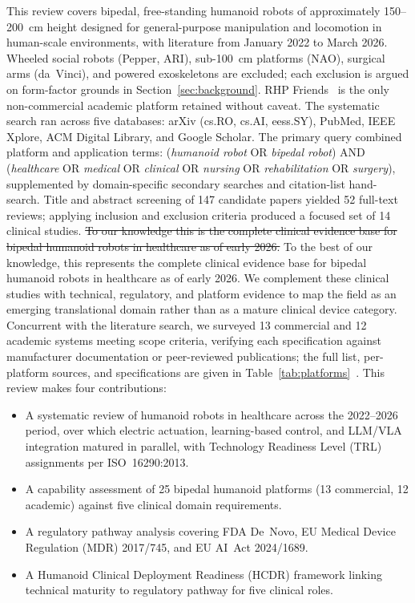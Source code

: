 This review covers bipedal, free-standing humanoid robots of approximately
150--200~cm height designed for general-purpose manipulation and locomotion in
human-scale environments, with literature from January 2022 to March 2026.
Wheeled social robots (Pepper, ARI), sub-100~cm platforms (NAO), surgical arms
(da~Vinci), and powered exoskeletons are excluded; each exclusion is argued on
form-factor grounds in Section~\ref{sec:background}. RHP
Friends~\cite{benallegue2025rhp} is the only non-commercial academic platform
retained without caveat. The systematic search ran across five databases: arXiv
(cs.RO, cs.AI, eess.SY), PubMed, IEEE Xplore, ACM Digital Library, and Google
Scholar. The primary query combined platform and application terms:
(\emph{humanoid robot} OR \emph{bipedal robot}) AND (\emph{healthcare} OR
\emph{medical} OR \emph{clinical} OR \emph{nursing} OR \emph{rehabilitation} OR
\emph{surgery}), supplemented by domain-specific secondary searches and
citation-list hand-search. Title and abstract screening of 147 candidate papers
yielded 52 full-text reviews; applying inclusion and exclusion criteria produced
a focused set of 14 clinical studies. \sout{ To our knowledge this is the complete
clinical evidence base for bipedal humanoid robots in healthcare as of early
2026.} To the best of our knowledge, this represents the complete clinical evidence base for bipedal humanoid robots in healthcare as of early 2026. We complement these clinical studies with technical, regulatory, and
platform evidence to map the field as an emerging translational domain rather
than as a mature clinical device category.
Concurrent with the literature search, we surveyed 13
commercial and 12 academic systems meeting scope criteria, verifying each
specification against manufacturer documentation or peer-reviewed publications;
the full list, per-platform sources, and specifications are given in
Table~\ref{tab:platforms}~\cite{figureai2024unveils,unitree2024g1,bostondynamics2024atlas,apptronik2023apollo,sanctuaryai2023phoenix,dafarra2024icub3}. This review makes four contributions:


\begin{itemize}
\item A systematic review of humanoid robots in healthcare across the 2022--2026
  period, over which electric actuation, learning-based control, and LLM/VLA
  integration matured in parallel, with Technology Readiness Level (TRL)
  assignments per ISO~16290:2013.
\item A capability assessment of 25 bipedal humanoid platforms (13 commercial,
  12 academic) against five clinical domain requirements.
\item A regulatory pathway analysis covering FDA De~Novo, EU Medical Device
  Regulation (MDR) 2017/745, and EU AI~Act 2024/1689.
\item A Humanoid Clinical Deployment Readiness (HCDR) framework linking technical
  maturity to regulatory pathway for five clinical roles.
\end{itemize}

